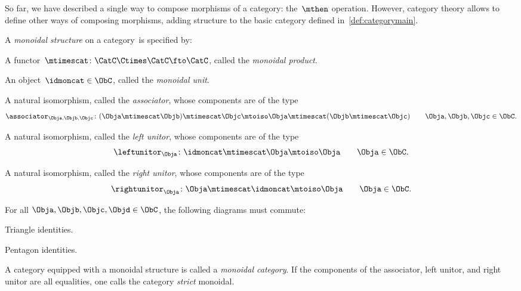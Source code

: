 So far, we have described a single way to compose morphisms of a category: the~$\mthen$ operation. However, category theory allows to define other ways of composing morphisms, adding structure to the basic category defined in~\cref{def:categorymain}.


\begin{ctdefinition}
  \label{def:monoidal_cat}
  A \emph{monoidal structure} on a category~\CatC is specified by:
  
  \constit
  \begin{compactenum}
    \item A functor~$\mtimescat \colon \CatC \Ctimes \CatC\fto \CatC$, called the \emph{monoidal product}.
    \item An object~$\idmoncat \in \ObC$, called the \emph{monoidal unit}.
    \item A natural isomorphism, called the \emph{associator}, whose components are of the type
    $$\associator_{\Obja,\Objb,\Objc}\colon (\Obja \mtimescat \Objb )\mtimescat \Objc \mtoiso \Obja\mtimescat (\Objb \mtimescat \Objc) \quad \quad \Obja,\Objb,\Objc\in \ObC.$$
     \item A natural isomorphism, called the \emph{left unitor}, whose components are of the type
     $$\leftunitor_\Obja \colon \idmoncat\mtimescat \Obja \mtoiso \Obja \quad \quad \Obja\in \ObC.$$
      \item A natural isomorphism, called the \emph{right unitor}, whose components are of the type
      $$\rightunitor_\Obja \colon \Obja \mtimescat \idmoncat \mtoiso \Obja \quad \quad \Obja\in \ObC.$$
  \end{compactenum}
  
   \condit
   
   For all $\Obja,\Objb,\Objc,\Objd\in \ObC$, the following diagrams must commute:
    \begin{compactenum}
    \item Triangle identities. 
  \begin{center}
  \end{center}
  \item Pentagon identities.  
  \begin{center}
  \end{center}
  
  \end{compactenum}
  
  \noindent A category equipped with a monoidal structure is called a \emph{monoidal category}.
  If the components of the associator, left unitor, and right unitor are all equalities, one calls the category \emph{strict} monoidal.
\end{ctdefinition}

